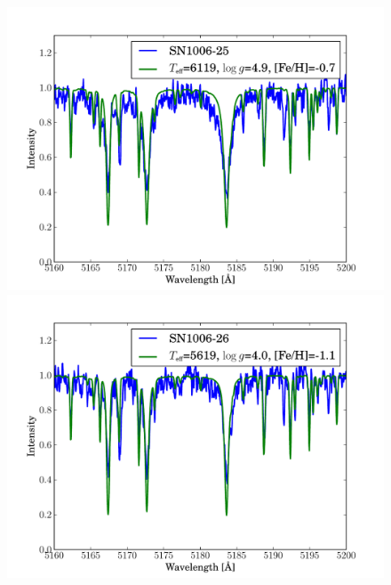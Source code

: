 \begin{figure}[tb]
   \label{fig:sn1006_candfit}
\end{figure}\begin{figure}[tb] %
   \centering
\includegraphics[width=1.1\textwidth, trim=0 0mm 0 10mm, clip]{chapter_sn1006/plots/gold_spectra/sn1006_25.pdf}
\includegraphics[width=1.1\textwidth, trim=0 0mm 0 10mm, clip]{chapter_sn1006/plots/gold_spectra/sn1006_26.pdf}


\end{figure}
